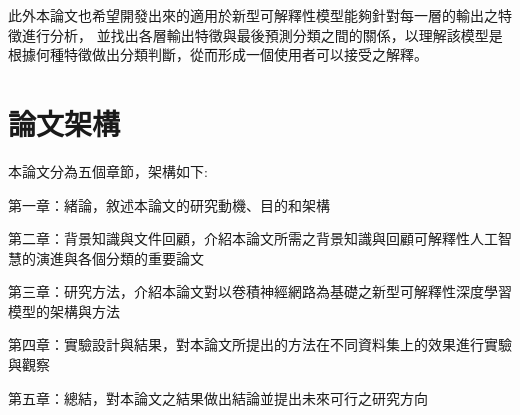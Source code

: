 \documentclass[class=NCU_thesis, crop=false]{standalone}
\begin{document}
此外本論文也希望開發出來的適用於新型可解釋性模型能夠針對每一層的輸出之特徵進行分析，
並找出各層輸出特徵與最後預測分類之間的關係，以理解該模型是根據何種特徵做出分類判斷，從而形成一個使用者可以接受之解釋。

\pagebreak
\section{論文架構}

本論文分為五個章節，架構如下:

第一章：緒論，敘述本論文的研究動機、目的和架構

第二章：背景知識與文件回顧，介紹本論文所需之背景知識與回顧可解釋性人工智慧的演進與各個分類的重要論文

第三章：研究方法，介紹本論文對以卷積神經網路為基礎之新型可解釋性深度學習模型的架構與方法

第四章：實驗設計與結果，對本論文所提出的方法在不同資料集上的效果進行實驗與觀察

第五章：總結，對本論文之結果做出結論並提出未來可行之研究方向
\end{document}
